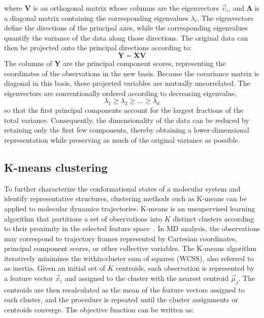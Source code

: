 where $\mathbf{V}$ is an orthogonal matrix whose columns are the eigenvectors $\vec{v}_i$, and $\mathbf{\Lambda}$ is a diagonal matrix containing the corresponding eigenvalues $\lambda_i$. The eigenvectors define the directions of the principal axes, while the corresponding eigenvalues quantify the variance of the data along those directions.
The original data can then be projected onto the principal directions according to:
\begin{equation}
\mathbf{Y} = \mathbf{X}\mathbf{V}
\end{equation}
The columns of $\mathbf{Y}$ are the principal component scores, representing the coordinates of the observations in the new basis. Because the covariance matrix is diagonal in this basis, these projected variables are mutually uncorrelated. The eigenvectors are conventionally ordered according to decreasing eigenvalue,
\begin{equation}
\lambda_1 \geq \lambda_2 \geq \dots \geq \lambda_d
\end{equation}
so that the first principal components account for the largest fractions of the total variance. Consequently, the dimensionality of the data can be reduced by retaining only the first few components, thereby obtaining a lower-dimensional representation while preserving as much of the original variance as possible.

\subsection{K-means clustering}
To further characterize the conformational states of a molecular system and identify representative structures, clustering methods such as K-means can be applied to molecular dynamics trajectories. K-means is an unsupervised learning algorithm that partitions a set of observations into $K$ distinct clusters according to their proximity in the selected feature space~\cite{MacQueen1967,Lloyd1982}. In MD analysis, the observations may correspond to trajectory frames represented by Cartesian coordinates, principal component scores, or other collective variables.
The K-means algorithm iteratively minimizes the within-cluster sum of squares (WCSS), also referred to as inertia. Given an initial set of $K$ centroids, each observation is represented by a feature vector $\vec{x}_i$ and assigned to the cluster with the nearest centroid $\vec{\mu}_j$. The centroids are then recalculated as the mean of the feature vectors assigned to each cluster, and the procedure is repeated until the cluster assignments or centroids converge. The objective function can be written as:

